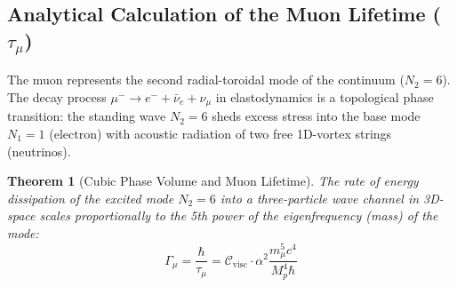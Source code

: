 \documentclass[12pt,a4paper]{article}
\newtheorem{theorem}{Theorem}
\begin{document}
		\subsection{Analytical Calculation of the Muon Lifetime ($\tau_\mu$)}
		The muon represents the second radial-toroidal mode of the continuum ($N_2=6$). The decay process $\mu^- \to e^- + \bar{\nu}_e + \nu_\mu$ in elastodynamics is a topological phase transition: the standing wave $N_2=6$ sheds excess stress into the base mode $N_1=1$ (electron) with acoustic radiation of two free 1D-vortex strings (neutrinos).
		
		\begin{theorem}[Cubic Phase Volume and Muon Lifetime]
			The rate of energy dissipation of the excited mode $N_2=6$ into a three-particle wave channel in 3D-space scales proportionally to the 5th power of the eigenfrequency (mass) of the mode:
			\begin{equation}
				\Gamma_\mu = \frac{\hbar}{\tau_\mu} = \mathcal{C}_{\mathrm{visc}} \cdot \alpha^2 \frac{m_\mu^5 c^4}{M_p^4 \hbar}
			\end{equation}
		\end{theorem}
		
\end{document}
